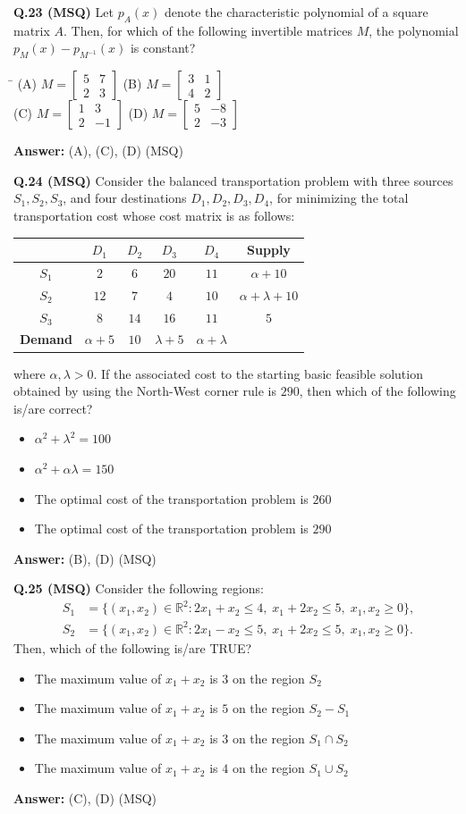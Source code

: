 \documentclass[11pt,a4paper]{article}
\newcommand{\optsfourA}[4]{%
  \begin{tabbing}
    \hspace{0.48\linewidth}\=\kill
    (A) #1 \> (B) #2 \\[2pt]
    (C) #3 \> (D) #4
  \end{tabbing}%
}
\newcommand{\optslistA}[4]{%
  \begin{itemize}
    \setlength{\itemsep}{2pt}\setlength{\parskip}{0pt}
    \item[(A)] #1
    \item[(B)] #2
    \item[(C)] #3
    \item[(D)] #4
  \end{itemize}%
}
\newcommand{\ans}[1]{\textbf{Answer:} #1\par\medskip}
\begin{document}
\textbf{Q.23 (MSQ)} Let $p_A(x)$ denote the characteristic polynomial of a square matrix $A$. Then, for which of the following invertible matrices $M$, the polynomial $p_M(x) - p_{M^{-1}}(x)$ is constant?
\optsfourA{$M = \begin{bmatrix} 5 & 7 \\ 2 & 3 \end{bmatrix}$}{$M = \begin{bmatrix} 3 & 1 \\ 4 & 2 \end{bmatrix}$}{$M = \begin{bmatrix} 1 & 3 \\ 2 & -1 \end{bmatrix}$}{$M = \begin{bmatrix} 5 & -8 \\ 2 & -3 \end{bmatrix}$}
\ans{(A), (C), (D) (MSQ)}

\textbf{Q.24 (MSQ)} Consider the balanced transportation problem with three sources $S_1, S_2, S_3$, and four destinations $D_1, D_2, D_3, D_4$, for minimizing the total transportation cost whose cost matrix is as follows:
\begin{center}
\begin{tabular}{cccccc}
\toprule
& $D_1$ & $D_2$ & $D_3$ & $D_4$ & \textbf{Supply} \\
\midrule
$S_1$ & $2$ & $6$ & $20$ & $11$ & $\alpha + 10$ \\
$S_2$ & $12$ & $7$ & $4$ & $10$ & $\alpha + \lambda + 10$ \\
$S_3$ & $8$ & $14$ & $16$ & $11$ & $5$ \\
\midrule
\textbf{Demand} & $\alpha + 5$ & $10$ & $\lambda + 5$ & $\alpha + \lambda$ & \\
\bottomrule
\end{tabular}
\end{center}
where $\alpha, \lambda > 0$. If the associated cost to the starting basic feasible solution obtained by using the North-West corner rule is $290$, then which of the following is/are correct?
\optslistA{$\alpha^2 + \lambda^2 = 100$}{$\alpha^2 + \alpha\lambda = 150$}{The optimal cost of the transportation problem is $260$}{The optimal cost of the transportation problem is $290$}
\ans{(B), (D) (MSQ)}

\textbf{Q.25 (MSQ)} Consider the following regions:
\begin{align*}
  S_1 &= \{(x_1, x_2) \in \mathbb{R}^2 : 2x_1 + x_2 \le 4, \; x_1 + 2x_2 \le 5, \; x_1, x_2 \ge 0\}, \\
  S_2 &= \{(x_1, x_2) \in \mathbb{R}^2 : 2x_1 - x_2 \le 5, \; x_1 + 2x_2 \le 5, \; x_1, x_2 \ge 0\}.
\end{align*}
Then, which of the following is/are TRUE?
\optslistA{The maximum value of $x_1 + x_2$ is $3$ on the region $S_2$}{The maximum value of $x_1 + x_2$ is $5$ on the region $S_2 - S_1$}{The maximum value of $x_1 + x_2$ is $3$ on the region $S_1 \cap S_2$}{The maximum value of $x_1 + x_2$ is $4$ on the region $S_1 \cup S_2$}
\ans{(C), (D) (MSQ)}
\end{document}
